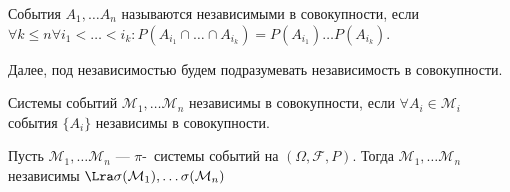 \begin{definition}
    События \(A_1, \dots A_n\) называются независимыми в совокупности, если \(\forall k \le n \forall i_1 < \dots < i_k: P(A_{i_1} \cap \dots \cap A_{i_k}) = P(A_{i_1})\dots P(A_{i_k})\).
\end{definition}

Далее, под независимостью будем подразумевать независимость в совокупности.

\begin{definition}
    Системы событий \(\mathcal{M}_1, \dots \mathcal{M}_n\) независимы в совокупности, если \(\forall A_i \in \mathcal{M}_i\) события \(\{A_i\}\) независимы в совокупности.
\end{definition}

\begin{theorem}
    Пусть \(\mathcal{M}_1, \dots \mathcal{M}_n\) --- \(\pi\)- системы событий на \((\Omega, \mathcal{F}, P)\). Тогда \(\mathcal{M}_1, \dots \mathcal{M}_n\) независимы \(\Lra \sigma(\mathcal{M}_1), \dots \sigma(\mathcal{M}_n)\)
\end{theorem}
